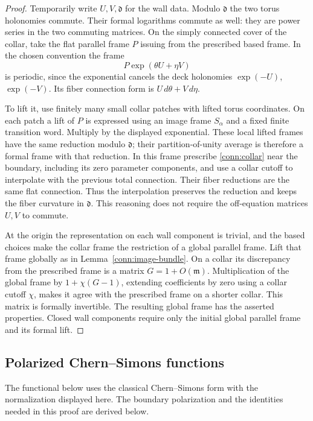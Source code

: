 \begin{proof}
Temporarily write \(U,V,\mathfrak d\) for the wall data.
Modulo \(\mathfrak d\) the two torus holonomies commute.
Their formal logarithms commute as well: they are power series
in the two commuting matrices.  On the simply connected cover
of the collar, take the flat parallel frame \(P\) issuing from
the prescribed based frame.  In the chosen convention the
frame
\[
 P\exp(\theta U+\eta V)
\]
is periodic, since the exponential cancels the deck
holonomies \(\exp(-U)\), \(\exp(-V)\).  Its fiber connection
form is \(U\,d\theta+V\,d\eta\).

To lift it, use finitely many small collar patches with lifted
torus coordinates.  On each patch a lift of \(P\) is expressed
using an image frame \(S_\alpha\) and a fixed finite transition
word.  Multiply by the displayed exponential.  These local
lifted frames have the same reduction modulo \(\mathfrak d\);
their partition-of-unity average is therefore a formal frame
with that reduction.  In this frame prescribe
\eqref{conn:collar} near the boundary, including its zero
parameter components, and use a collar cutoff to interpolate
with the previous total connection.  Their fiber reductions
are the same flat connection.  Thus the interpolation preserves
the reduction and keeps the fiber curvature in \(\mathfrak d\).
This reasoning does not require the off-equation matrices
\(U,V\) to commute.

At the origin the representation on each wall component is
trivial, and the based choices make the collar frame the
restriction of a global parallel frame.  Lift that frame
globally as in Lemma~\ref{conn:image-bundle}.  On a collar its
discrepancy from the prescribed frame is a matrix
\(G=1+O(\mathfrak m)\).  Multiplication of the global frame by
\(1+\chi(G-1)\), extending coefficients by zero using a collar
cutoff \(\chi\), makes it agree with the prescribed frame on a
shorter collar.  This matrix is formally invertible.  The
resulting global frame has the asserted properties.  Closed
wall components require only the initial global parallel
frame and its formal lift.
\end{proof}

\subsection{Polarized Chern--Simons functions}

The functional below uses the classical Chern--Simons form
\cite[Section~3, Propositions~3.2 and~3.8]{ChernSimons1974}
with the normalization displayed here.
The boundary polarization and the identities needed in this proof
are derived below.

